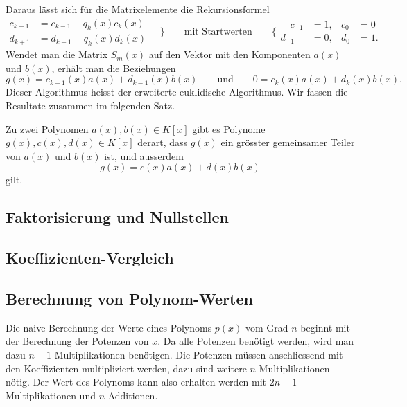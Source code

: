 Daraus lässt sich für die Matrixelemente die Rekursionsformel
\[
\begin{aligned}
c_{k+1} &= c_{k-1} - q_k(x) c_k(x) \\
d_{k+1} &= d_{k-1} - q_k(x) d_k(x)
\end{aligned}
\quad
\bigg\}
\qquad
\text{mit Startwerten}
\qquad
\bigg\{
\begin{aligned}
\quad
c_{-1} &= 1, & c_0 &= 0 \\
d_{-1} &= 0, & d_0 &= 1.
\end{aligned}
\]
Wendet man die Matrix $S_m(x)$ auf den Vektor mit den Komponenten
$a(x)$ und $b(x)$, erhält man die Beziehungen
\[
g(x) = c_{k-1}(x) a(x) + d_{k-1}(x) b(x)
\qquad\text{und}\qquad
0 = c_k(x) a(x) + d_k(x) b(x).
\]
Dieser Algorithmus heisst der erweiterte euklidische Algorithmus.
Wir fassen die Resultate zusammen im folgenden Satz.

\begin{satz}
Zu zwei Polynomen $a(x),b(x) \in K[x]$ gibt es Polynome
$g(x),c(x),d(x)\in K[x]$
derart, dass $g(x)$ ein grösster gemeinsamer Teiler von $a(x)$ und $b(x)$
ist, und ausserdem
\[
g(x) = c(x)a(x)+d(x)b(x)
\]
gilt.
\end{satz}

\subsection{Faktorisierung und Nullstellen}

\subsection{Koeffizienten-Vergleich}

\subsection{Berechnung von Polynom-Werten}
Die naive Berechnung der Werte eines Polynoms $p(x)$ vom Grad $n$
beginnt mit der Berechnung der Potenzen von $x$.
Da alle Potenzen benötigt werden, wird man dazu $n-1$ Multiplikationen
benötigen.
Die Potenzen müssen anschliessend mit den Koeffizienten multipliziert
werden, dazu sind weitere $n$ Multiplikationen nötig.
Der Wert des Polynoms kann also erhalten werden mit $2n-1$ Multiplikationen
und $n$ Additionen.

